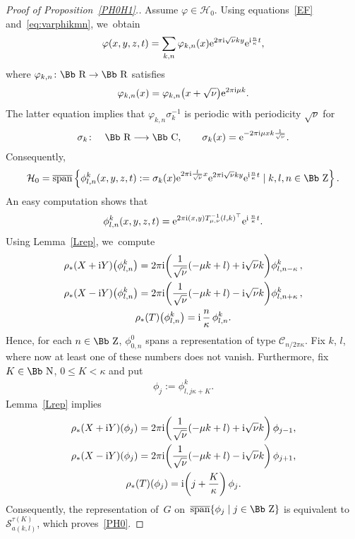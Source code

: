 \documentclass[pdftex]{sigma}
\newcommand\CC{{\mbox{\Bb C}}}
\newcommand\RR{{\mbox{\Bb R}}}
\newcommand\NN{{\mbox{\Bb N}}}
\newcommand\ZZ{{\mbox{\Bb Z}}}
\newcommand\cC{{\mathcal C}}
\newcommand\cH{{\mathcal H}}
\newcommand{\cSpan}{{\overline{\rm span}}}
\numberwithin{equation}{section}
\begin{document}
\begin{proof}[Proof of Proposition~\ref{PH0H1}.]
Assume $\varphi\in \cH_0$. Using equations~\eqref{EF} and~\eqref{eq:varphikmn}, we~obtain
\begin{gather*}
\varphi(x,y,z,t)
=\sum_{k,n}\varphi_{k,n}(x){\rm e}^{2\pi {\rm i}\sqrt\nu ky}{\rm e}^{{\rm i} \frac{n}{\kappa}t},
\end{gather*}
where $\varphi_{k,n}\colon \RR\rightarrow\RR$ satisfies
\begin{gather*}
\varphi_{k,n}(x)=\varphi_{k,n}\big(x+\sqrt\nu\big) {\rm e}^{2\pi {\rm i}\mu k}.
\end{gather*}
The latter equation implies that $\varphi_{k,n}\sigma_k^{-1}$ is periodic with periodicity $\sqrt\nu$ for
\begin{gather*}
\sigma_k\colon\quad \RR\longrightarrow\CC,\qquad
\sigma_k(x)={\rm e}^{-2\pi {\rm i}\mu xk\frac{1}{\sqrt\nu}}.
\end{gather*}
Consequently,
\begin{gather*}
\cH_0=\cSpan\left\{\phi_{l,n}^k(x,y,z,t):=\sigma_k(x){\rm e}^{2\pi {\rm i} \frac l{\sqrt\nu}x} {\rm e}^{2\pi {\rm i}\sqrt\nu ky} {\rm e}^{{\rm i} \frac n\kappa t}\mid k,l,n\in\ZZ\right\}.
\end{gather*}
An easy computation shows that
\begin{gather*}
\phi_{l,n}^k(x,y,z,t)={\rm e}^{2\pi {\rm i}(x,y)T_{\mu,\nu}^{-1}(l,k)^\top} {\rm e}^{{\rm i}\,\frac n\kappa t}.
\end{gather*}
Using Lemma~\ref{Lrep}, we~compute
\begin{gather*}
\rho_*(X+{\rm i}Y)\big(\phi_{l,n}^k\big)= {2\pi {\rm i} \bigg(\frac 1{\sqrt\nu}(-\mu k+l)+{\rm i}\sqrt \nu k \bigg) \phi_{l,n-\kappa}^k}\,,
\\
\rho_*(X-{\rm i}Y)\big(\phi_{l,n}^k\big)= {2\pi {\rm i} \bigg(\frac 1{\sqrt\nu}(-\mu k+l)-{\rm i}\sqrt \nu k \bigg) \phi_{l,n+\kappa}^k}\,,
\\
\rho_*(T)\big(\phi_{l,n}^k\big)={\rm i}\,\frac n\kappa\, \phi_{l,n}^k.
\end{gather*}
Hence, for each $n\in\ZZ$, $\phi_{0,n}^0$ spans a representation of type $\cC_{n/2\pi\kappa}$. Fix $k$, $l$, where now at least one of these numbers does not vanish. Furthermore, fix $K\in \NN$, $0\le K<\kappa$ and put
\begin{gather*}
\phi_j:=\phi^k_{l,j\kappa+K}.
\end{gather*}
Lemma~\ref{Lrep} implies
\begin{gather*}
\rho_*(X+{\rm i}Y)(\phi_j)={2\pi {\rm i} \bigg(\frac 1{\sqrt\nu}(-\mu k+l)+{\rm i}\sqrt \nu k \bigg) \, \phi_{j-1}},
\\
\rho_*(X-{\rm i}Y)(\phi_j)={2\pi {\rm i} \bigg(\frac 1{\sqrt\nu}(-\mu k+l)-{\rm i}\sqrt \nu k \bigg) \, \phi_{j+1}},
\\
\rho_*(T)(\phi_j)={\rm i}\bigg(j+\frac K\kappa\bigg)\, \phi_j.
\end{gather*}
Consequently, the representation of~$G$ on~$\cSpan\{\phi_j\mid j\in\ZZ\}$ is equivalent to~${\mathcal S}_{a(k,l)}^{\tau(K)}$,
which pro\-ves~\eqref{PH0}.


\end{proof}
\end{document}
